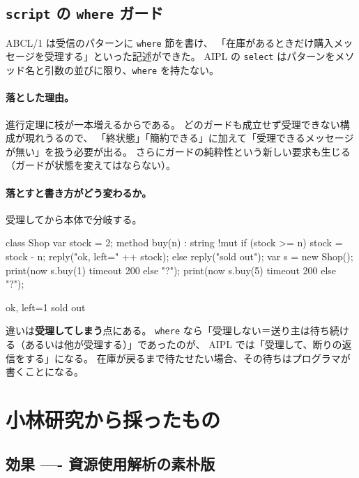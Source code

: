 \documentclass[11pt,a4paper]{ltjsarticle}
\theoremstyle{definition}
\theoremstyle{remark}
\begin{document}
\subsection{\texttt{script} の \texttt{where} ガード}

ABCL/1 は受信のパターンに \texttt{where} 節を書け、
「在庫があるときだけ購入メッセージを受理する」といった記述ができた。
AIPL の \texttt{select} はパターンをメソッド名と引数の並びに限り、\texttt{where} を持たない。

\paragraph{落とした理由。}
進行定理に枝が一本増えるからである。
どのガードも成立せず受理できない構成が現れうるので、
「終状態」「簡約できる」に加えて「受理できるメッセージが無い」を扱う必要が出る。
さらにガードの純粋性という新しい要求も生じる（ガードが状態を変えてはならない）。

\paragraph{落とすと書き方がどう変わるか。}
受理してから本体で分岐する。

\begin{aipl}
class Shop {
  var stock = 2;
  method buy(n) : string !{mut} {
    if (stock >= n) { stock = stock - n; reply("ok, left=" ++ stock); }
    else { reply("sold out"); }
  }
}
var s = new Shop();
print(now s.buy(1) timeout 200 else "?");
print(now s.buy(5) timeout 200 else "?");
\end{aipl}
\begin{term}
ok, left=1
sold out
\end{term}

違いは\textbf{受理してしまう}点にある。
\texttt{where} なら「受理しない＝送り主は待ち続ける（あるいは他が受理する）」であったのが、
AIPL では「受理して、断りの返信をする」になる。
在庫が戻るまで待たせたい場合、その待ちはプログラマが書くことになる。

\section{小林研究から採ったもの}
\label{sec:koba-take}

\subsection{効果 ---- 資源使用解析の素朴版}
\end{document}
